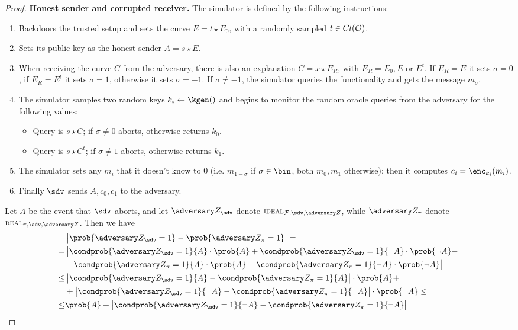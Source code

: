 \begin{proof}
    \textbf{Honest sender and corrupted receiver.} The simulator is defined by the following instructions:
    \begin{enumerate}
        \item Backdoors the trusted setup and sets the curve $E=t\star E_0$, with a randomly sampled $t\in Cl(\mathcal{O})$.
        \item Sets its public key as the honest sender $A=s\star E$.
        \item When receiving the curve $C$ from the adversary, there is also an explanation $C=x\star E_R$, with $E_R=E_0,E$ or $E^t$. If $E_R=E$ it sets $\sigma=0$, if $E_R=E^t$ it sets $\sigma=1$, otherwise it sets $\sigma=-1$. If $\sigma\neq -1$, the simulator queries the functionality and gets the message $m_\sigma$.
        \item The simulator samples two random keys $k_i\xleftarrow{}\kgen()$ and begins to monitor the random oracle queries from the adversary for the following values:
        \begin{itemize}
            \item Query is $s\star C$; if $\sigma\neq0$ aborts, otherwise returns $k_0$.
            \item Query is $s\star C^t$; if $\sigma\neq1$ aborts, otherwise returns $k_1$.
        \end{itemize}
        \item The simulator sets any $m_i$ that it doesn't know to $0$ (i.e. $m_{1-\sigma}$ if $\sigma\in\bin$, both $m_0,m_1$ otherwise); then it computes $c_i=\enc_{k_i}(m_i)$.
        \item Finally $\sdv$ sends $A,c_0,c_1$ to the adversary.
    \end{enumerate}
    
    Let $A$ be the event that $\sdv$ aborts, and let $\zdv_\sdv$ denote $\textsc{\scriptsize IDEAL}_{\Fun,\sdv,\zdv}$, while $\zdv_\pi$ denote $\textsc{\scriptsize REAL}_{\pi,\adv,\zdv}$. Then we have
    \begin{align*}
         & \left|\prob{\zdv_\sdv=1}-\prob{\zdv_\pi=1}\right| =\\
        = & \left|\condprob{\zdv_\sdv=1}{A}\cdot\prob{A} + \condprob{\zdv_\sdv=1}{\neg A}\cdot\prob{\neg A} -\right.\\
        & \left.- \condprob{\zdv_\pi=1}{A}\cdot\prob{A} - \condprob{\zdv_\pi=1}{\neg A}\cdot\prob{\neg A}\right| \\
        \le & \left| \condprob{\zdv_\sdv=1}{A} - \condprob{\zdv_\pi=1}{A}\right|\cdot\prob{A}  +\\
         &+ \left| \condprob{\zdv_\sdv=1}{\neg A} - \condprob{\zdv_\pi=1}{\neg A}\right|\cdot\prob{\neg A} \le \\
        \le & \prob{A} + \left| \condprob{\zdv_\sdv=1}{\neg A} - \condprob{\zdv_\pi=1}{\neg A}\right|
    \end{align*}


\end{proof}
